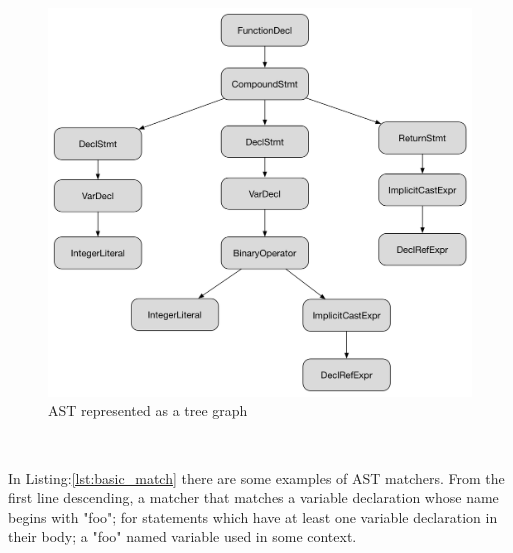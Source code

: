 \begin{figure}[h]
	\centering
	\caption{AST represented as a tree graph}
	\includegraphics[scale = 0.4]{images/ast_diagram}
\end{figure}\
\par In Listing:\ref{lst:basic_match} there are some examples of AST matchers.  From the first line descending, a matcher that matches a variable declaration whose name begins with "foo"; for statements which have at least one variable declaration in their body; a "foo" named variable used in some context.

